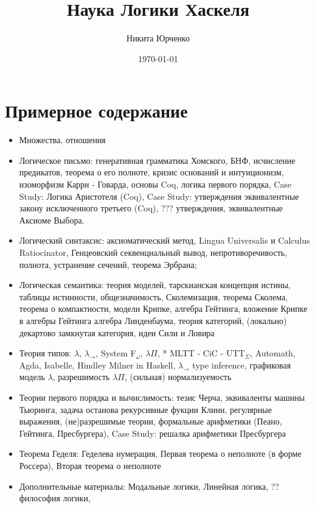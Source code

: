 \documentclass[10pt,a4paper]{article}
\date{\today}
\author{Никита Юрченко}
\title{Наука Логики Хаскеля}
\theoremstyle{definition}
\begin{document}
\maketitle
\newpage
{}  

\section{Примерное содержание}
\begin{itemize}

\item Множества, отношения

\item Логическое письмо:
  генеративная грамматика Хомского,
  БНФ,
  исчисление предикатов,
  теорема о его полноте,
  кризис оснований и интуиционизм,
  изоморфизм Карри - Говарда,
  основы Coq,
  логика первого порядка,
  Case Study: Логика Аристотеля (Coq),
  Case Study: утверждения эквивалентные закону исключенного третьего (Coq),
  ??? утверждения, эквивалентные Аксиоме Выбора.
  
\item Логический синтаксис:
  аксиоматический метод,
  Lingua Universalis и Calculus Ratiocinator,
  Генцеовский секвенциальный вывод,
  непротиворечивость,
  полнота,
  устранение сечений,
  теорема Эрбрана;

\item Логическая семантика:
  теория моделей,
  тарскианская концепция истины,
  таблицы истинности,
  общезначимость,
  Сколемизация,
  теорема Сколема,
  теорема о компактности,
  модели Крипке,
  алгебра Гейтинга,
  вложение Крипке в алгебры Гейтинга
  алгебра Линденбаума,
  теория категорий,
  (локально) декартово замкнутая категория,
  идеи Сили и Ловира

\item Теория типов:
  $\lambda$,
  $\lambda_\rightarrow$,
  System F$_\omega$,
  $\lambda \Pi$,
  * MLTT - CiC - UTT$_\Sigma$,
  Automath, Agda, Isabelle,
  Hindley Milner in Haskell,
  $\lambda_\rightarrow$ type inference,
  графиковая модель $\lambda$,
  разрешимость $\lambda \Pi$,
  (сильная) нормализуемость

\item Теории первого порядка и вычислимость:
  тезис Черча,
  эквиваленты машины Тьюринга,
  задача останова
  рекурсивные фукции Клини,
  регулярные выражения,
  (не)разрешимые теории,
  формальные арифметики (Пеано, Гейтинга, Пресбургера),
  Case Study: решалка арифметики Пресбургера

\item Теорема Геделя:
  Геделева нумерация,
  Первая теорема о неполноте (в форме Россера),
  Вторая теорема о неполноте

\item Дополнительные материалы:
  Модальные логики,
  Линейная логика,
  ?? философия логики,

\end{itemize}
\end{document}
